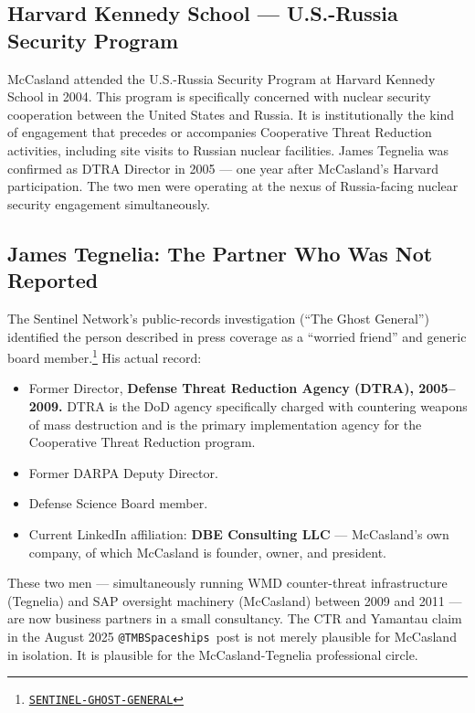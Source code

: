 \documentclass[11pt]{article}
\makeatletter
\newcommand{\account}{\texttt{@TMBSpaceships}}
\newcommand{\src}[2]{\href{#1}{\texttt{#2}}}
\makeatother
\begin{document}
\subsection{Harvard Kennedy School — U.S.-Russia Security Program}

McCasland attended the U.S.-Russia Security Program at Harvard Kennedy School in 2004. This program is specifically concerned with nuclear security cooperation between the United States and Russia. It is institutionally the kind of engagement that precedes or accompanies Cooperative Threat Reduction activities, including site visits to Russian nuclear facilities. James Tegnelia was confirmed as DTRA Director in 2005 — one year after McCasland's Harvard participation. The two men were operating at the nexus of Russia-facing nuclear security engagement simultaneously.

\subsection{James Tegnelia: The Partner Who Was Not Reported}

The Sentinel Network's public-records investigation (``The Ghost General'') identified the person described in press coverage as a ``worried friend'' and generic board member.\footnote{\src{https://thesentinel.network/p/the-ghost-general-every-news-outlet}{SENTINEL-GHOST-GENERAL}} His actual record:

\begin{itemize}
  \item Former Director, \textbf{Defense Threat Reduction Agency (DTRA), 2005--2009.} DTRA is the DoD agency specifically charged with countering weapons of mass destruction and is the primary implementation agency for the Cooperative Threat Reduction program.
  \item Former DARPA Deputy Director.
  \item Defense Science Board member.
  \item Current LinkedIn affiliation: \textbf{DBE Consulting LLC} — McCasland's own company, of which McCasland is founder, owner, and president.
\end{itemize}

These two men — simultaneously running WMD counter-threat infrastructure (Tegnelia) and SAP oversight machinery (McCasland) between 2009 and 2011 — are now business partners in a small consultancy. The CTR and Yamantau claim in the August 2025 \account\ post is not merely plausible for McCasland in isolation. It is plausible for the McCasland-Tegnelia professional circle.
\end{document}
